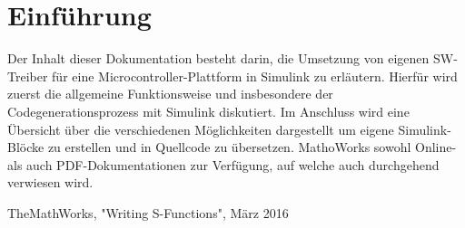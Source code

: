 \documentclass{article}
\begin{document}
\section{Einführung}
Der Inhalt dieser Dokumentation besteht darin, die Umsetzung von eigenen SW-Treiber für eine Microcontroller-Plattform in Simulink zu erläutern. Hierfür wird zuerst die allgemeine Funktionsweise und insbesondere der Codegenerationsprozess mit Simulink diskutiert. Im Anschluss wird eine Übersicht über die verschiedenen Möglichkeiten dargestellt um eigene Simulink-Blöcke zu erstellen und in Quellcode zu übersetzen. MathoWorks sowohl Online- als auch PDF-Dokumentationen zur Verfügung, auf welche auch durchgehend verwiesen wird.

\newpage


\newpage
\renewcommand\refname{Literaturverzeichnis}
\begin{thebibliography}{}
	 TheMathWorks, "Writing S-Functions", März 2016
\end{thebibliography}
\end{document}
